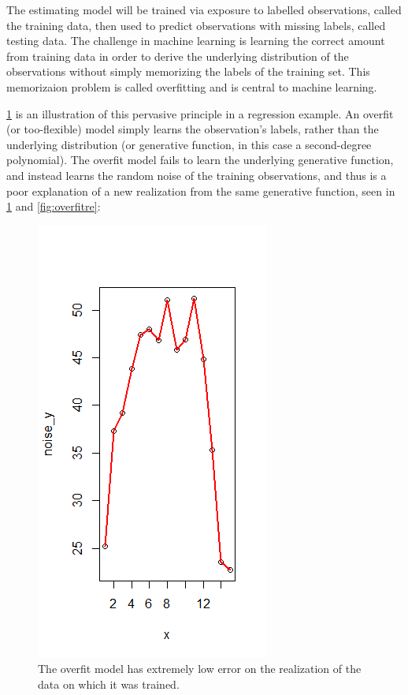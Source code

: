 \documentclass[12pt,twoside]{reedthesis}
\begin{document}
The estimating model will be trained via exposure to labelled
observations, called the training data, then used to predict
observations with missing labels, called testing data. The challenge in
machine learning is learning the correct amount from training data in
order to derive the underlying distribution of the observations without
simply memorizing the labels of the training set. This memorizaion
problem is called overfitting and is central to machine learning.

\ref{fig:overfit} is an illustration of this pervasive principle in a
regression example. An overfit (or too-flexible) model simply learns the
observation's labels, rather than the underlying distribution (or
generative function, in this case a second-degree polynomial). The
overfit model fails to learn the underlying generative function, and
instead learns the random noise of the training observations, and thus
is a poor explanation of a new realization from the same generative
function, seen in \ref{fig:overfit} and \ref{fig:overfitre}:
\begin{figure}
\centering
\includegraphics{figure/overfit.png}
\caption{\label{fig:overfit}The overfit model has extremely low error on the
realization of the data on which it was trained.}
\end{figure}
\end{document}

